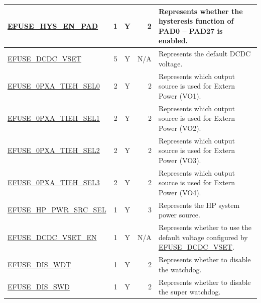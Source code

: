 \begin{longtable}[l]{ |m{8.2cm}|r|c|r|m{9cm}| }
    \hline
    \hyperref[fielddesc:EFUSEHYSENPAD]{EFUSE\_HYS\_EN\_PAD} & 1 & Y & 2 & Represents whether the hysteresis function of PAD0 – PAD27 is enabled.\\
    \hline
    \hyperref[fielddesc:EFUSEDCDCVSET]{EFUSE\_DCDC\_VSET} & 5 & Y & N/A & Represents the default DCDC voltage.\\
    \hline
    \hyperref[fielddesc:EFUSE0PXATIEHSEL0]{EFUSE\_0PXA\_TIEH\_SEL0} & 2 & Y & 2 & Represents which output source is used for Extern Power (VO1).\\
    \hline
    \hyperref[fielddesc:EFUSE0PXATIEHSEL1]{EFUSE\_0PXA\_TIEH\_SEL1} & 2 & Y & 2 & Represents which output source is used for Extern Power (VO2).\\
    \hline
    \hyperref[fielddesc:EFUSE0PXATIEHSEL2]{EFUSE\_0PXA\_TIEH\_SEL2} & 2 & Y & 2 & Represents which output source is used for Extern Power (VO3).\\
    \hline
    \hyperref[fielddesc:EFUSE0PXATIEHSEL3]{EFUSE\_0PXA\_TIEH\_SEL3} & 2 & Y & 2 & Represents which output source is used for Extern Power (VO4).\\
    \hline
    \hyperref[fielddesc:EFUSEHPPWRSRCSEL]{EFUSE\_HP\_PWR\_SRC\_SEL} & 1 & Y & 3 & Represents the HP system power source.\\
    \hline
    \hyperref[fielddesc:EFUSEDCDCVSETEN]{EFUSE\_DCDC\_VSET\_EN} & 1 & Y & N/A & Represents whether to use the default voltage configured by \hyperref[fielddesc:EFUSEDCDCVSET]{EFUSE\_DCDC\_VSET}.\\
    \hline
    \hyperref[fielddesc:EFUSEDISWDT]{EFUSE\_DIS\_WDT} & 1 & Y & 2 & Represents whether to disable the watchdog.\\
    \hline
    \hyperref[fielddesc:EFUSEDISSWD]{EFUSE\_DIS\_SWD} & 1 & Y & 2 & Represents whether to disable the super watchdog.\\
    \hline
\end{longtable}
